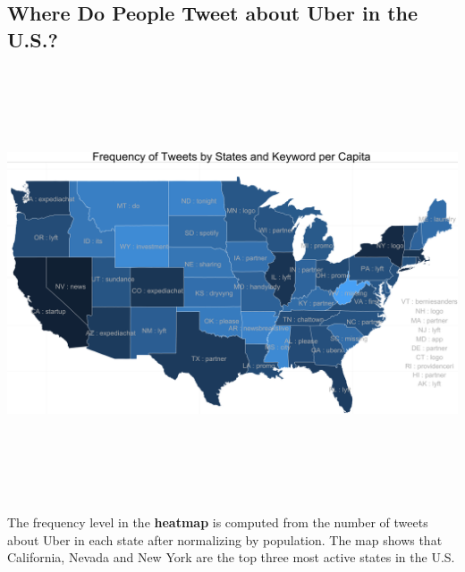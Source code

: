 \documentclass[a222,landscape]{a0poster}
\begin{document}
\begin{multicols}{4}
\section*{Where Do People Tweet about Uber in the U.S.?}
\begin{center}\vspace{0cm}
\includegraphics[width=0.9\linewidth, height=5in]{../figures/Poster_Heatmap}
\end{center}\vspace{0cm}
The frequency level in the \textbf{heatmap} is computed from the number of tweets about Uber in each state after normalizing by population. The map shows that California, Nevada and New York are the top three most active states in the U.S.
\\


\end{multicols}
\end{document}

